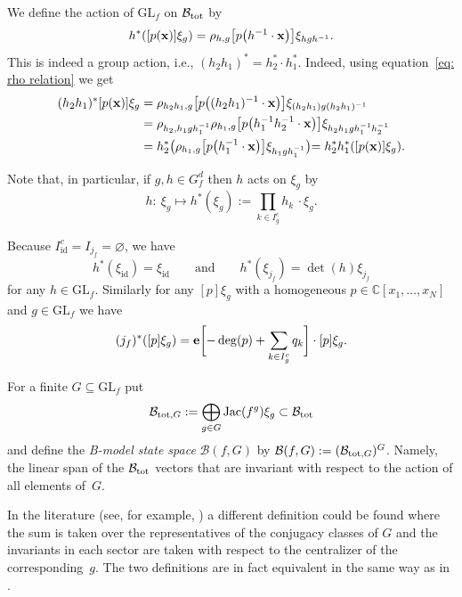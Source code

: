 \documentclass[pdftex]{sigma}
\numberwithin{equation}{section}
\newcommand{\CC}{{\mathbb{C}}}
\newcommand{\GL}{{\mathrm{GL}}}
\newcommand{\epi}{{\bf e}}
\newcommand{\Jac}{\mathrm{Jac}}
\newcommand{\id}{\mathrm{id}}
\newcommand{\bx}{{\bf x}}
\def\B{{\mathcal B}}
\begin{document}
We define the action of $\GL_f$ on $\B_{\rm tot}$ by
\begin{align*}
h^*([p(\bx)]\xi_{g})=\rho_{h,g}\bigl[p\bigl(h^{-1}\cdot\bx\bigl)\bigr]\xi_{hgh^{-1}}.
\end{align*}
This is indeed a group action, i.e., $(h_2h_1)^* = h_2^* \cdot h_1^*$. Indeed, using equation~\eqref{eq: rho relation} we get
\begin{align*}
(h_2h_1)^*[p(\bx)]\xi_{g} &=\rho_{h_2h_1,g}\bigl[p\bigl((h_2h_1)^{-1}\cdot\bx\bigr)\bigr]\xi_{(h_2h_1)g(h_2h_1)^{-1}}
\\ &=\rho_{h_2,h_1gh_1^{-1}}\rho_{h_1,g}\bigl[p\bigl(h_1^{-1}h_2^{-1}\cdot\bx\bigr)\bigr]\xi_{h_2h_1gh_1^{-1}h_2^{-1}}
\\ &=h_2^*\bigl(\rho_{h_1,g}\bigl[p\bigl(h_1^{-1}\cdot\bx\bigl)\bigl]\xi_{h_1gh_1^{-1}}\bigl)=h_2^*h_1^*([p(\bx)]\xi_{g}).
\end{align*}

Note that, in particular, if $g,h\in G_f^d$ then $h$ acts on $\xi_g$ by
\begin{equation*}%
	h\colon\ \xi_g\mapsto h^{*} (\xi_g) := \prod_{k\in I_g^c} h_k\,\cdot \xi_g.
\end{equation*}

\begin{Example}\label{ex: J--action and bigrading}
Because $I_\id^c = I_{j_f} = \varnothing$, we have
\[
 h^*(\xi_\id) = \xi_\id \qquad \text{and} \qquad h^*(\xi_{j_f}) = \det(h) \xi_{j_f}
\]
for any $h \in \GL_f$.
Similarly for any $[p]\xi_g$ with a homogeneous $p \in \CC[x_1,\dots,x_N]$ and $g\in \GL_f$ we have
\[
(j_f)^*([p]\xi_g) = \epi\biggl[-\deg(p) + \sum_{k \in I_g^c} q_k\biggr] \cdot [p]\xi_g.
\]
\end{Example}

For a finite $G \subseteq \GL_f$ put
\[\B_{{\rm tot},G}:=\bigoplus_{g \in G} \Jac(f^g) \xi_g\subset \B_{\rm tot}\]
and define the \textit{B-model state space} $\B(f,G)$ by
$\B(f,G) := ( \B_{{\rm tot},G} )^G$. Namely, the linear span of the $\B_{\rm tot}$ vectors that are invariant with respect to the action of all elements of~$G$.

\begin{Remark}
 In the literature (see, for example, \cite{Muk}) a different definition could be found where the sum is taken over the representatives of the conjugacy classes of $G$ and the invariants in each sector are taken with respect to the centralizer of the corresponding~$g$. The two definitions are in fact equivalent in the same way as in \cite[Proposition~42]{BI22}.
\end{Remark}
\end{document}
